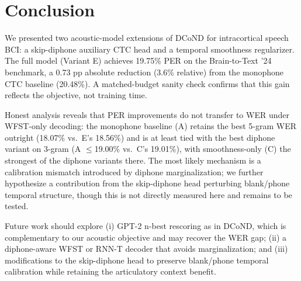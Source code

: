 \documentclass[10pt,twocolumn]{article}
\begin{document}
\section{Conclusion}

We presented two acoustic-model extensions of DCoND for intracortical
speech BCI: a skip-diphone auxiliary CTC head and a temporal smoothness
regularizer.  The full model (Variant E) achieves 19.75\% PER on the
Brain-to-Text '24 benchmark, a 0.73 pp absolute reduction (3.6\% relative)
from the monophone CTC baseline (20.48\%).  A matched-budget sanity check
confirms that this gain reflects the objective, not training time.

Honest analysis reveals that PER improvements do not transfer to WER under
WFST-only decoding: the monophone baseline (A) retains the best 5-gram WER
outright (18.07\% vs.\ E's 18.56\%) and is at least tied with the best diphone
variant on 3-gram (A $\leq$19.00\% vs.\ C's 19.01\%), with smoothness-only (C)
the strongest of the diphone variants there.  The
most likely mechanism is a calibration mismatch introduced by diphone
marginalization; we further hypothesize a contribution from the skip-diphone
head perturbing blank/phone temporal structure, though this is not directly
measured here and remains to be tested.

Future work should explore (i) GPT-2 n-best rescoring as in DCoND, which
is complementary to our acoustic objective and may recover the WER gap;
(ii) a diphone-aware WFST or RNN-T decoder that avoids marginalization;
and (iii) modifications to the skip-diphone head to preserve blank/phone
temporal calibration while retaining the articulatory context benefit.



\end{document}
